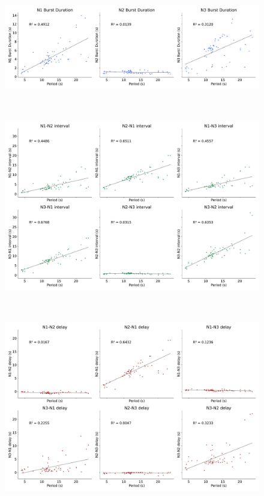 \begin{figure}[htbp]
\begin{minipage}{0.9\textwidth}
\begin{minipage}[b]{0.53\textwidth}
			\begin{minipage}[b]{\textwidth}
				\centering
				\includegraphics[width=\textwidth]{./invariants/data/SUSSEX/prep3/images/prep3_3phases_durations.pdf}
			\end{minipage}\\
			\begin{minipage}[b]{\textwidth}
				\centering
				\includegraphics[width=\textwidth]{./invariants/data/SUSSEX/prep3/images/prep3_3phases_intervals.pdf}
			\end{minipage}\\
			\begin{minipage}[b]{\textwidth}
				\centering
				\includegraphics[width=\textwidth]{./invariants/data/SUSSEX/prep3/images/prep3_3phases_delays.pdf}

\end{minipage}
\end{minipage}
\end{minipage}
\end{figure}
